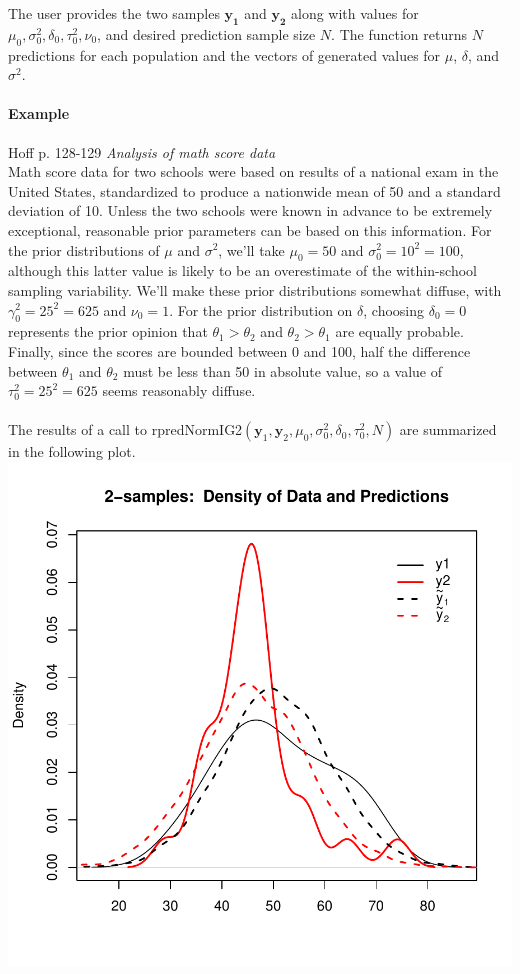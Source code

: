 \documentclass[12pt, a4paper]{article}
\begin{document}
      The user provides the two samples $\mathbf{y_1}$ and $\mathbf{y_2}$ along with values for $\mu_0, \sigma^2_0, \delta_0, \tau^2_0, \nu_0$, and desired prediction sample size $N$.  The function returns $N$ predictions for each population and the vectors of generated values for $\mu$, $\delta$, and $\sigma^2$.

      \paragraph{Example}

      Hoff p. 128-129 \textit{Analysis of math score data}\\
      Math score data for two schools were based on results of a national exam in the United States, standardized to produce a nationwide mean of 50 and a standard deviation of 10.  Unless the two schools were known in advance to be extremely exceptional, reasonable prior parameters can be based on this information.  For the prior distributions of $\mu$ and $\sigma^2$, we'll take $\mu_0 = 50$ and $\sigma^2_0 = 10^2 = 100$, although this latter value is likely to be an overestimate of the within-school sampling variability.  We'll make these prior distributions somewhat diffuse, with $\gamma^2_0 = 25^2 = 625$ and $\nu_0 = 1$.  For the prior distribution on $\delta$, choosing $\delta_0 = 0$ represents the prior opinion that $\theta_1 > \theta_2$ and $\theta_2 > \theta_1$ are equally probable.  Finally, since the scores are bounded between 0 and 100, half the difference between $\theta_1$ and $\theta_2$ must be less than 50 in absolute value, so a value of $\tau^2_0 = 25^2 = 625$ seems reasonably diffuse.\\\\
      The results of a call to rpredNormIG2$\left(\mathbf{y}_1,\mathbf{y}_2,\mu_0,\sigma^2_0,\delta_0,\tau^2_0,N\right)$ are summarized in the following plot.\\

\includegraphics{Thesis-007}
\end{document}
